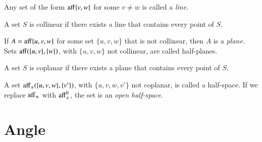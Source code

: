 


	
\begin{definition}[line]	
Any set of the form ${\operatorname{aff}}\{v,w\}$ for some $v\ne w$ is called a 
 {\it line.}
\end{definition}

\begin{definition}[collinear]  A set $S$ is collinear if there exists
a line that contains every point of $S$.
\end{definition}

\begin{definition}	
If $A={\operatorname{aff}}\{u,v,w\}$ for some set $\{u,v,w\}$ that is not collinear,
then $A$ is a {\it plane.}  Sets ${\operatorname{aff}}(\{u,v\},\{w\})$, with
$\{u,v,w\}$ not collinear, are called half-planes.
\end{definition}

\begin{definition}[coplanar] A set $S$ is  coplanar if there exists
a plane that contains every point of $S$.
\end{definition}

\begin{definition} A set ${\operatorname{aff}}_{\pm}(\{u,v,w\},\{v'\})$,
with $\{u,v,w,v'\}$ not coplanar, is called a half-space.  If
we replace ${\operatorname{aff}}_{\pm}$ with ${\operatorname{aff}}_{\pm}^0$, the set is an
{\it open half-space}.
\end{definition}

\section{Angle}\label{sec:angle}

